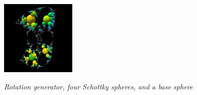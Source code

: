 \begin{figure}[h!tbp]
\begin{minipage}[t]{0.5\hsize}
\begin{minipage}{0.25\hsize}
  \end{minipage}
  \hspace*{\fill}
  \begin{minipage}{0.25\hsize}
   \center
   \includegraphics[width=1.4in, height=1.4in, keepaspectratio]{./img/application/3dGen/rotationOrb.pdf}
   \label{fig:rotationOrb}
  \end{minipage}
  \hspace*{\fill}
  \caption{\textit{Rotation generator, four Schottky spheres, and a base
  sphere}}
  \label{fig:rotation3d}
 \end{minipage}
\end{figure}

